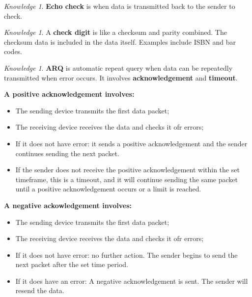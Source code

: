\documentclass[8pt]{article}
\theoremstyle{remark}
\newtheorem{knowledge}[method]{Knowledge}
\begin{document}
        \begin{knowledge}
            \textbf{Echo check} is when data is transmitted back to the sender to check.
        \end{knowledge}

        \begin{knowledge}
            A \textbf{check digit} is like a checksum and parity combined. The checksum data is included in the data itself. Examples include ISBN and bar codes. 
        \end{knowledge}

        \begin{knowledge}
            \textbf{ARQ} is automatic repeat query when data can be repeatedly transmitted when error occurs. It involves \textbf{acknowledgement} and \textbf{timeout}.

            \textbf{A positive acknowledgement involves:}
            \begin{itemize}
                \item The sending device transmits the first data packet;
                \item The receiving device receives the data and checks it ofr errors;
                \item If it does not have error: it sends a positive acknowledgement and the sender continues sending the next packet.
                \item If the sender does not receive the positive acknowledgement within the set timeframe, this is a timeout, and it will continue sending the same packet until a positive acknowledgement occurs or a limit is reached.
            \end{itemize}

            \textbf{A negative ackowledgement involves:}
            \begin{itemize}
                \item The sending device transmits the first data packet;
                \item The receiving device receives the data and checks it ofr errors;
                \item If it does not have error: no further action. The sender begins to send the next packet after the set time period.
                \item If it does have an error: A negative acknowledgement is sent. The sender will resend the data.
            \end{itemize}
        \end{knowledge}
\end{document}
